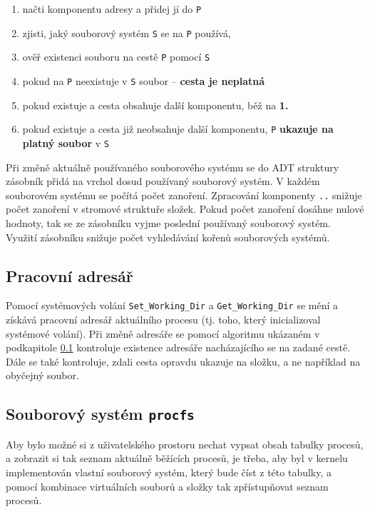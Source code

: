 \documentclass[12pt, a4paper]{article}
\begin{document}
\begin{enumerate}
    \item načti komponentu adresy a přidej jí do \texttt{P}
    \item zjisti, jaký souborový systém \texttt{S} se na \texttt{P} používá, 
    \item ověř existenci souboru na cestě \texttt{P} pomocí \texttt{S}
    \item pokud na \texttt{P} neexistuje v \texttt{S} soubor -- \textbf{cesta je neplatná}
    \item pokud existuje a cesta obsahuje další komponentu, běž na \textbf{1.}
    \item pokud existuje a cesta již neobsahuje další komponentu, \texttt{P} \textbf{ukazuje na platný soubor} v \texttt{S}
\end{enumerate}

Při změně aktuálně používaného souborového systému se do ADT struktury zásobník přidá na vrchol dosud používaný souborový systém. V každém souborovém systému se počítá počet zanoření. Zpracování komponenty \texttt{..} snižuje počet zanoření v stromové struktuře složek. Pokud počet zanoření dosáhne nulové hodnoty, tak se ze zásobníku vyjme poslední používaný souborový systém. Využití zásobníku snižuje počet vyhledávání kořenů souborových systémů. 

\subsection{Pracovní adresář} \label{wd}
Pomocí systémových volání \texttt{Set\_Working\_Dir} a \texttt{Get\_Working\_Dir} se mění a získává pracovní adresář aktuálního procesu (tj. toho, který inicializoval systémové volání). Při změně adresáře se pomocí algoritmu ukázaném v podkapitole \ref{wd} kontroluje existence adresáře nacházajícího se na zadané cestě. Dále se také kontroluje, zdali cesta opravdu ukazuje na složku, a ne například na obyčejný soubor.

\subsection{Souborový systém \texttt{procfs}}
Aby bylo možné si z uživatelského prostoru nechat vypsat obsah tabulky procesů, a zobrazit si tak seznam aktuálně běžících procesů, je třeba, aby byl v kernelu implementován vlastní souborový systém, který bude číst z této tabulky, a pomocí kombinace virtuálních souborů a složky tak zpřístupňovat seznam procesů.
\end{document}
